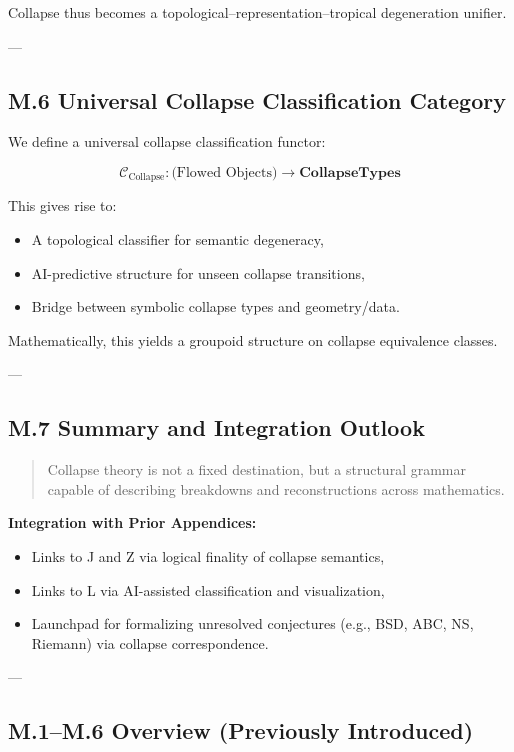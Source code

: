 \documentclass[11pt]{article}
\begin{document}
\begin{axiom}
\begin{axiom}
{{Collapse thus becomes a topological–representation–tropical degeneration unifier.

---

\subsection*{M.6 Universal Collapse Classification Category}

We define a universal collapse classification functor:

\[
\mathcal{C}_{\text{Collapse}} : \text{(Flowed Objects)} \to \mathbf{CollapseTypes}
\]

This gives rise to:

\begin{itemize}
  \item A topological classifier for semantic degeneracy,
  \item AI-predictive structure for unseen collapse transitions,
  \item Bridge between symbolic collapse types and geometry/data.
\end{itemize}

Mathematically, this yields a groupoid structure on collapse equivalence classes.

---

\subsection*{M.7 Summary and Integration Outlook}

\begin{quote}
Collapse theory is not a fixed destination, but a structural grammar  
capable of describing breakdowns and reconstructions across mathematics.
\end{quote}

\textbf{Integration with Prior Appendices:}
\begin{itemize}
  \item Links to J and Z via logical finality of collapse semantics,
  \item Links to L via AI-assisted classification and visualization,
  \item Launchpad for formalizing unresolved conjectures (e.g., BSD, ABC, NS, Riemann) via collapse correspondence.
\end{itemize}

---

\subsection*{M.1–M.6 Overview (Previously Introduced)}

}}
\end{axiom}
\end{axiom}
\end{document}
